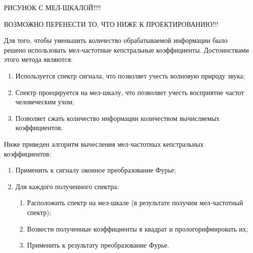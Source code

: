 РИСУНОК С МЕЛ-ШКАЛОЙ!!!!

ВОЗМОЖНО ПЕРЕНЕСТИ ТО, ЧТО НИЖЕ К ПРОЕКТИРОВАНИЮ!!!

Для того, чтобы уменьшить количество обрабатываемой информации было решено использовать мел-частотные кепстральные коэффициенты. Достоинствами этого метода являются:
\begin{enumerate}
  \item Используется спектр сигнала, что позволяет учесть волновую природу звука;
  \item Спектр проецируется на мел-шкалу, что позволяет учесть восприятие частот человеческим ухом;
  \item Позволяет сжать количество информации количеством вычисляемых коэффициентов.
\end{enumerate}

Ниже приведен алгоритм вычесления мел-частотных кепстральных коэффициентов:
\begin{enumerate}
  \item Применить к сигналу оконное преобразование Фурье;
  \item Для каждого полученного спектра:
    \begin{enumerate}
      \item Расположить спектр на мел-шкале (в результате получим мел-частотный спектр);
      \item Возвести полученные коэффициенты в квадрат и прологорифмировать их;
      \item Применить к результату преобразование Фурье.
    \end{enumerate}
\end{enumerate}
